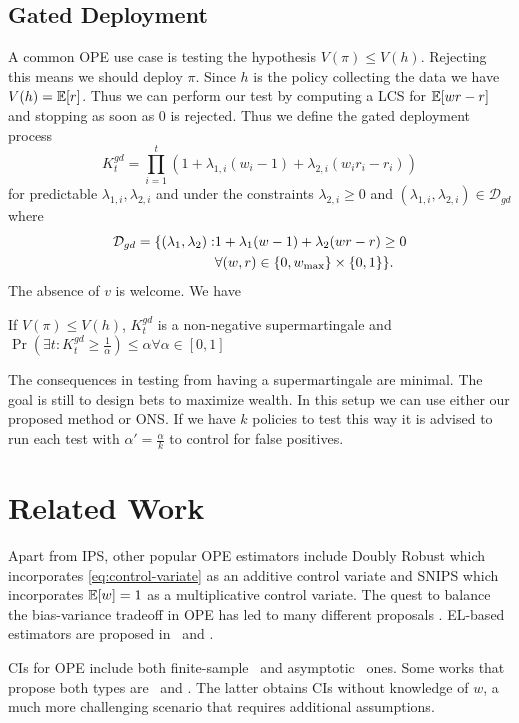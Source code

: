 \subsection{Gated Deployment}
A common OPE use case is testing the hypothesis $V(\pi)\leq V(h)$. Rejecting
this means we should deploy $\pi$. Since $h$ is the policy collecting the data
we have $V(h)=\mathbb{E}[r]$. Thus we can perform our test by computing a LCS for
$\mathbb{E}[wr-r]$ and stopping as soon as 0 is rejected.  Thus we define the
gated deployment process
\[
K_t^{gd} = \prod_{i=1}^t \left(1+\lambda_{1,i} (w_i-1) + \lambda_{2,i}(w_ir_i -r_i)\right)  
\]
for predictable $\lambda_{1,i},\lambda_{2,i}$ and under the constraints
$\lambda_{2,i} \geq 0$ and $(\lambda_{1,i},\lambda_{2,i}) \in \mathcal{D}_{gd}$
where
\begin{align}
\mathcal{D}_{gd} = \{(\lambda_{1},\lambda_{2}): & 1+\lambda_1(w-1)+\lambda_2(wr-r)\geq 0 \notag\\
                         & \forall (w,r) \in \{0,w_{\max}\}\times \{0,1\}
\}.
\end{align}
The absence of $v$ is welcome. We have
\begin{theorem}
If $V(\pi)\leq V(h)$, $K_t^{gd}$ is a non-negative supermartingale and $\Pr\left(\exists t: K_t^{gd}\geq \frac{1}{\alpha}\right) \leq \alpha \forall \alpha \in [0,1]$ 
\end{theorem}
The consequences in testing from having a supermartingale are minimal. The goal
is still to design bets to maximize wealth.  In this setup we can use either
our proposed method or ONS. If we have $k$ policies to test this way it is
advised to run each test with $\alpha'=\frac{\alpha}{k}$ to control for false
positives.

\section{Related Work}
\label{sec:related}

Apart from IPS, other popular OPE estimators include Doubly Robust \cite{RnR,
dudik2011doubly} which incorporates \eqref{eq:control-variate} as an additive
control variate and SNIPS \cite{swaminathan2015self} which incorporates
$\mathbb{E}[w]=1$ as a multiplicative control variate.  The quest to balance the
bias-variance tradeoff in OPE has led to many different 
proposals \cite{SWITCH,vlassis2019design}.
EL-based estimators are proposed in~\cite{kallus2019intrinsically} and
\cite{karampatziakis2019empirical}.

CIs for OPE include both finite-sample~\cite{thomas2015high} and
asymptotic~\cite{li2015counterfactual,karampatziakis2019empirical} ones. Some
works that propose both types are~\cite{bottou2013counterfactual} and
\cite{dai2020coindice}. The latter obtains CIs without knowledge of $w$, a much
more challenging scenario that requires additional assumptions.

